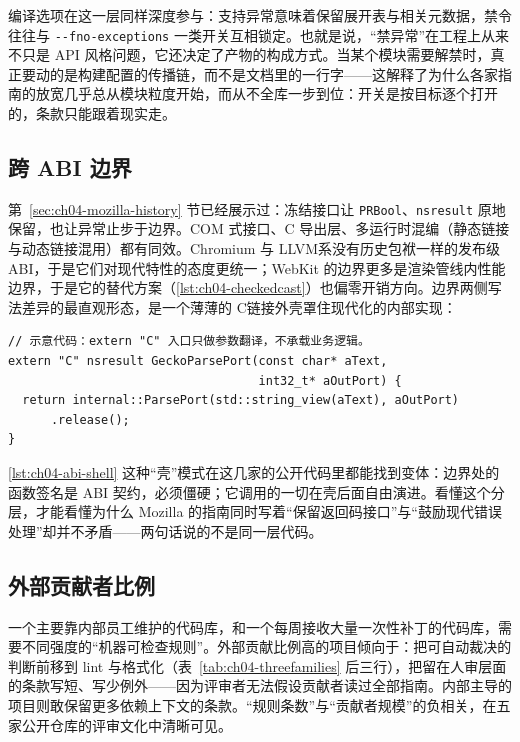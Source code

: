 \documentclass[12pt,a4paper,fontset=fandol]{ctexbook}
\newcommand{\Tp}[1]{\texttt{#1}}
\newcommand{\Opt}[1]{\texttt{-\/-#1}}
\newcommand{\Lang}[1]{\textsf{#1}}
\newcommand{\CL}{\Lang{C}}
\newcommand{\DomLlvm}{\Lang{LLVM}}
\begin{document}
编译选项在这一层同样深度参与：支持异常意味着保留展开表与相关元数据，禁令往往与 \Opt{fno-exceptions} 一类开关互相锁定。也就是说，``禁异常''在工程上从来不只是 API 风格问题，它还决定了产物的构成方式。当某个模块需要解禁时，真正要动的是构建配置的传播链，而不是文档里的一行字——这解释了为什么各家指南的放宽几乎总从模块粒度开始，而从不全库一步到位：开关是按目标逐个打开的，条款只能跟着现实走。

\subsection{跨 ABI 边界}
\label{sec:ch04-abi-pressure}

第~\ref{sec:ch04-mozilla-history} 节已经展示过：冻结接口让 \Tp{PRBool}、\Tp{nsresult} 原地保留，也让异常止步于边界。COM 式接口、C 导出层、多运行时混编（静态链接与动态链接混用）都有同效。Chromium 与 \DomLlvm 系没有历史包袱一样的发布级 ABI，于是它们对现代特性的态度更统一；WebKit 的边界更多是渲染管线内性能边界，于是它的替代方案（\ref{lst:ch04-checkedcast}）也偏零开销方向。边界两侧写法差异的最直观形态，是一个薄薄的 \CL 链接外壳罩住现代化的内部实现：

\begin{lstlisting}[style=cppstyle,caption={示意：边界内自由演进，边界外只保留扁平的 C 链接入口},label={lst:ch04-abi-shell}]
// 示意代码：extern "C" 入口只做参数翻译，不承载业务逻辑。
extern "C" nsresult GeckoParsePort(const char* aText,
                                   int32_t* aOutPort) {
  return internal::ParsePort(std::string_view(aText), aOutPort)
      .release();
}
\end{lstlisting}

\ref{lst:ch04-abi-shell} 这种``壳''模式在这几家的公开代码里都能找到变体：边界处的函数签名是 ABI 契约，必须僵硬；它调用的一切在壳后面自由演进。看懂这个分层，才能看懂为什么 Mozilla 的指南同时写着``保留返回码接口''与``鼓励现代错误处理''却并不矛盾——两句话说的不是同一层代码。

\subsection{外部贡献者比例}
\label{sec:ch04-contributor-pressure}

一个主要靠内部员工维护的代码库，和一个每周接收大量一次性补丁的代码库，需要不同强度的``机器可检查规则''。外部贡献比例高的项目倾向于：把可自动裁决的判断前移到 lint 与格式化（表~\ref{tab:ch04-threefamilies} 后三行），把留在人审层面的条款写短、写少例外——因为评审者无法假设贡献者读过全部指南。内部主导的项目则敢保留更多依赖上下文的条款。``规则条数''与``贡献者规模''的负相关，在五家公开仓库的评审文化中清晰可见。
\end{document}
